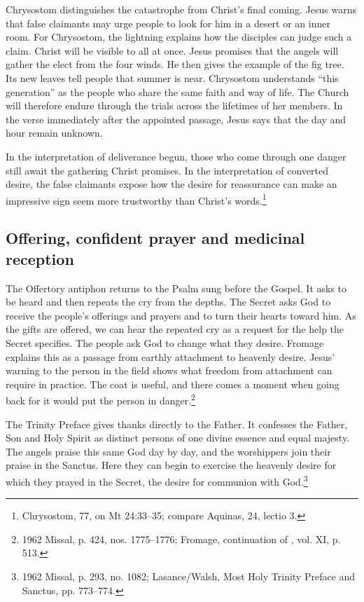Chrysostom distinguishes the catastrophe from Christ's final coming.
Jesus warns that false claimants may urge people to look for him in a
desert or an inner room. For Chrysostom, the lightning explains how the
disciples can judge such a claim. Christ will be visible to all at once.
Jesus promises that the angels will gather the elect from the four winds.
He then gives the example of the fig tree. Its new leaves tell people
that summer is near. Chrysostom understands ``this generation'' as the
people who share the same faith and way of life. The Church will therefore
endure through the trials across the lifetimes of her members. In the verse
immediately after the appointed passage, Jesus says that the day and hour
remain unknown.

In the interpretation of deliverance begun, those who come through one danger
still await the gathering Christ promises. In the interpretation of converted
desire, the false claimants expose how the desire for reassurance can make
an impressive sign seem more trustworthy than Christ's words.\footnote{Chrysostom,
 77, on Mt 24:33--35; compare Aquinas,
 24, lectio 3.}

\subsection{Offering, confident prayer and medicinal reception}

The Offertory antiphon returns to the Psalm sung before the Gospel. It
asks to be heard and then repeats the cry from the depths. The Secret
asks God to receive the people's offerings and prayers and to turn their
hearts toward him. As the gifts are offered, we can hear the repeated
cry as a request for the help the Secret specifies. The people ask God
to change what they desire. Fromage explains this as a passage from
earthly attachment to heavenly desire. Jesus' warning to the person in
the field shows what freedom from attachment can require in practice.
The coat is useful, and there comes a moment when going back for it
would put the person in danger.\footnote{1962 Missal, p. 424,
nos. 1775--1776; Fromage, continuation of ,
vol. XI, p. 513.}

The Trinity Preface gives thanks directly to the Father. It confesses the
Father, Son and Holy Spirit as distinct persons of one divine essence and
equal majesty. The angels praise this same God day by day, and the
worshippers join their praise in the Sanctus. Here they can begin to
exercise the heavenly desire for which they prayed in the Secret, the
desire for communion with God.\footnote{1962 Missal, p. 293, no. 1082; Lasance/Walsh,
Most Holy Trinity Preface and Sanctus, pp. 773--774.}

